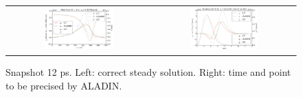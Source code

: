 \documentclass[preprint,12pt]{elsarticle}
\newcommand{\figscale}{0.5}
\begin{document}
\begin{figure}[tbh]
  \begin{center}
    \begin{tabular}{cc}
      \includegraphics[width=\figscale\textwidth]{../VFPdata/C7_Aladin_case1_heatflux.png} &
      \includegraphics[width=\figscale\textwidth]{../VFPdata/C7_Aladin_case1_kinetics.png}
    \end{tabular}
  \caption{  
  Snapshot 12 ps. Left: correct steady solution. Right: time and point to be precised by ALADIN.}
  \end{center}
  \label{fig:C7_ALADIN_case1}
\end{figure}
\end{document}
